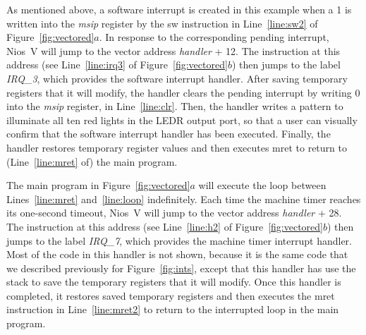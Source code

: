 \documentclass[11pt, twoside, pdftex]{article}
\newcommand{\commonPath}{../../Common}
\begin{document}
As mentioned above, a software interrupt is created in this example when a 1 is written
into the {\it msip} register by the {\sf sw} instruction in Line~\ref{line:sw2} of 
Figure~\ref{fig:vectored}$a$. In response to the corresponding pending interrupt,
Nios~V will jump to the vector address {\it handler} + 12. The instruction at this address
(see Line~\ref{line:irq3} of Figure~\ref{fig:vectored}$b$)
then jumps to the label {\it IRQ\_3}, which provides the software interrupt handler. 
After saving temporary registers that it will modify, the handler clears the pending
interrupt by writing 0 into the {\it msip} register, in Line~\ref{line:clr}. Then, the
handler writes a pattern to illuminate all ten red lights in the LEDR output port, so that
a user can visually confirm that the software interrupt handler has been executed.
Finally, the handler restores temporary register values and then executes {\sf mret} to 
return to (Line~\ref{line:mret} of) the main program.

The main program in Figure~\ref{fig:vectored}$a$ will execute the loop between 
Lines~\ref{line:mret} and~\ref{line:loop} indefinitely. Each time the machine timer
reaches its one-second timeout, Nios~V will jump to the vector address {\it handler} + 28.
The instruction at this address (see Line~\ref{line:h2} of Figure~\ref{fig:vectored}$b$)
then jumps to the label {\it IRQ\_7}, which provides the 
machine timer interrupt handler. Most of the code in this handler is not shown, because it
is the same code that we described previously for Figure~\ref{fig:ints}, except that this
handler has use the stack to save the temporary registers that it will modify. Once this 
handler is completed, it restores saved temporary registers and then 
executes the {\sf mret} instruction in Line~\ref{line:mret2}
to return to the interrupted loop in the main program.



\end{document}
